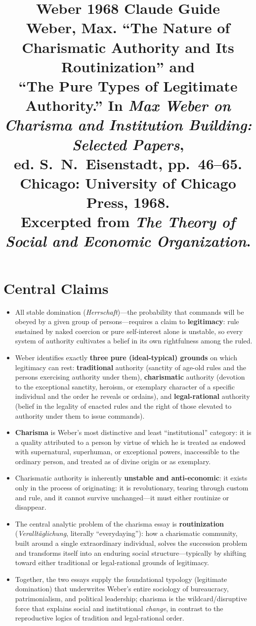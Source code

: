 \documentclass[12pt]{article}
\title{\textbf{Weber 1968 Claude Guide}\\
\large Weber, Max. ``The Nature of Charismatic Authority and Its Routinization'' and\\
``The Pure Types of Legitimate Authority.'' In \textit{Max Weber on Charisma and Institution Building: Selected Papers},\\
ed. S.\ N.\ Eisenstadt, pp.\ 46--65. Chicago: University of Chicago Press, 1968.\\
Excerpted from \textit{The Theory of Social and Economic Organization}.}
\author{}
\date{}
\begin{document}
\maketitle
\tableofcontents
\newpage

\section{Central Claims}

\begin{itemize}[leftmargin=*, itemsep=4pt]
    \item All stable domination (\textit{Herrschaft})---the probability that commands will be obeyed by a given group of persons---requires a claim to \textbf{legitimacy}: rule sustained by naked coercion or pure self-interest alone is unstable, so every system of authority cultivates a belief in its own rightfulness among the ruled.
    \item Weber identifies exactly \textbf{three pure (ideal-typical) grounds} on which legitimacy can rest: \textbf{traditional} authority (sanctity of age-old rules and the persons exercising authority under them), \textbf{charismatic} authority (devotion to the exceptional sanctity, heroism, or exemplary character of a specific individual and the order he reveals or ordains), and \textbf{legal-rational} authority (belief in the legality of enacted rules and the right of those elevated to authority under them to issue commands).
    \item \textbf{Charisma} is Weber's most distinctive and least ``institutional'' category: it is a quality attributed to a person by virtue of which he is treated as endowed with supernatural, superhuman, or exceptional powers, inaccessible to the ordinary person, and treated as of divine origin or as exemplary.
    \item Charismatic authority is inherently \textbf{unstable and anti-economic}: it exists only in the process of originating: it is revolutionary, tearing through custom and rule, and it cannot survive unchanged---it must either routinize or disappear.
    \item The central analytic problem of the charisma essay is \textbf{routinization} (\textit{Veralltäglichung}, literally ``everydaying''): how a charismatic community, built around a single extraordinary individual, solves the succession problem and transforms itself into an enduring social structure---typically by shifting toward either traditional or legal-rational grounds of legitimacy.
    \item Together, the two essays supply the foundational typology (legitimate domination) that underwrites Weber's entire sociology of bureaucracy, patrimonialism, and political leadership; charisma is the wildcard/disruptive force that explains social and institutional \emph{change}, in contrast to the reproductive logics of tradition and legal-rational order.
\end{itemize}
\end{document}
